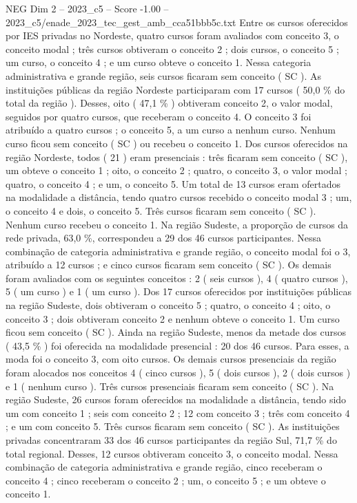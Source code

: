 \begin{textsample}{NEG Dim 2 – 2023\_c5 – Score -1.00 – 2023\_c5/enade\_2023\_tec\_gest\_amb\_cca51bbb5c.txt}
Entre os cursos oferecidos por IES privadas no Nordeste, quatro cursos foram avaliados com conceito 3, o conceito modal ; três cursos obtiveram o conceito 2 ; dois cursos, o conceito 5 ; um curso, o conceito 4 ; e um curso obteve o conceito 1.
Nessa categoria administrativa e grande região, seis cursos ficaram sem conceito ( SC ).
As instituições públicas da região Nordeste participaram com 17 cursos ( 50,0 \% do total da região ).
Desses, oito ( 47,1 \% ) obtiveram conceito 2, o valor modal, seguidos por quatro cursos, que receberam o conceito 4.
O conceito 3 foi atribuído a quatro cursos ; o conceito 5, a um curso a nenhum curso.
Nenhum curso ficou sem conceito ( SC ) ou recebeu o conceito 1.
Dos cursos oferecidos na região Nordeste, todos ( 21 ) eram presenciais : três ficaram sem conceito ( SC ), um obteve o conceito 1 ; oito, o conceito 2 ; quatro, o conceito 3, o valor modal ; quatro, o conceito 4 ; e um, o conceito 5.
Um total de 13 cursos eram ofertados na modalidade a distância, tendo quatro cursos recebido o conceito modal 3 ; um, o conceito 4 e dois, o conceito 5.
Três cursos ficaram sem conceito ( SC ).
Nenhum curso recebeu o conceito 1.
Na região Sudeste, a proporção de cursos da rede privada, 63,0 \%, correspondeu a 29 dos 46 cursos participantes.
Nessa combinação de categoria administrativa e grande região, o conceito modal foi o 3, atribuído a 12 cursos ; e cinco cursos ficaram sem conceito ( SC ).
Os demais foram avaliados com os seguintes conceitos : 2 ( seis cursos ), 4 ( quatro cursos ), 5 ( um curso ) e 1 ( um curso ).
Dos 17 cursos oferecidos por instituições públicas na região Sudeste, dois obtiveram o conceito 5 ; quatro, o conceito 4 ; oito, o conceito 3 ; dois obtiveram conceito 2 e nenhum obteve o conceito 1.
Um curso ficou sem conceito ( SC ).
Ainda na região Sudeste, menos da metade dos cursos ( 43,5 \% ) foi oferecida na modalidade presencial : 20 dos 46 cursos.
Para esses, a moda foi o conceito 3, com oito cursos.
Os demais cursos presenciais da região foram alocados nos conceitos 4 ( cinco cursos ), 5 ( dois cursos ), 2 ( dois cursos ) e 1 ( nenhum curso ).
Três cursos presenciais ficaram sem conceito ( SC ).
Na região Sudeste, 26 cursos foram oferecidos na modalidade a distância, tendo sido um com conceito 1 ; seis com conceito 2 ; 12 com conceito 3 ; três com conceito 4 ; e um com conceito 5.
Três cursos ficaram sem conceito ( SC ).
As instituições privadas concentraram 33 dos 46 cursos participantes da região Sul, 71,7 \% do total regional.
Desses, 12 cursos obtiveram conceito 3, o conceito modal.
Nessa combinação de categoria administrativa e grande região, cinco receberam o conceito 4 ; cinco receberam o conceito 2 ; um, o conceito 5 ; e um obteve o conceito 1.

\end{textsample}
